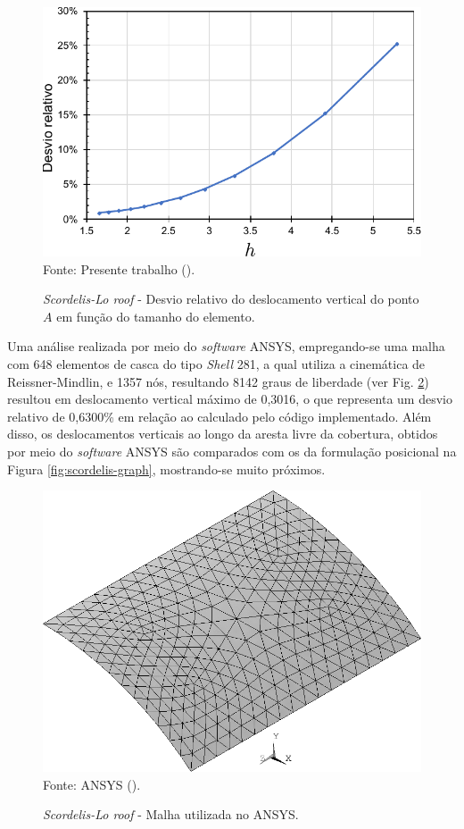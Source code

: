 \begin{figure}[h!]
    \centering
    \caption{\textit{Scordelis-Lo roof} - Desvio relativo do deslocamento vertical do ponto $A$ em função do tamanho do elemento.}
    \includegraphics[width=0.6\linewidth]{Figuras/scordelis/static-sol.pdf}
    \\Fonte: Presente trabalho (\the\year).
    \label{fig:shell-static-sol}
\end{figure}

Uma análise realizada por meio do \textit{software} ANSYS, empregando-se uma malha com 648 elementos de casca do tipo \textit{Shell} 281, a qual utiliza a cinemática de Reissner-Mindlin, e 1357 nós, resultando 8142 graus de liberdade (ver Fig. \ref{fig:scordelisANSYS}) resultou em deslocamento vertical máximo de 0,3016, o que representa um desvio relativo de 0,6300\% em relação ao calculado pelo código implementado. Além disso, os deslocamentos verticais ao longo da aresta livre da cobertura, obtidos por meio do \textit{software} ANSYS são comparados com os da formulação posicional na Figura \ref{fig:scordelis-graph}, mostrando-se muito próximos.

\begin{figure}[h!]
    \centering
    \caption{\textit{Scordelis-Lo roof} - Malha utilizada no ANSYS.}
    \includegraphics[width=0.45\linewidth]{Figuras/scordelis/ANSYS.png}
    \\Fonte: ANSYS (\the\year).
    \label{fig:scordelisANSYS}
\end{figure}


